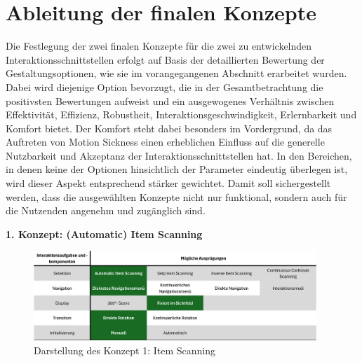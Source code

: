 \section{Ableitung der finalen Konzepte}

Die Festlegung der zwei finalen Konzepte für die zwei zu entwickelnden Interaktionsschnittstellen erfolgt auf Basis der detaillierten Bewertung der Gestaltungsoptionen, wie sie im vorangegangenen Abschnitt erarbeitet wurden. Dabei wird diejenige Option bevorzugt, die in der Gesamtbetrachtung die positivsten Bewertungen aufweist und ein ausgewogenes Verhältnis zwischen Effektivität, Effizienz, Robustheit, Interaktionsgeschwindigkeit, Erlernbarkeit und Komfort bietet.
Der Komfort steht dabei besonders im Vordergrund, da das Auftreten von Motion Sickness einen erheblichen Einfluss auf die generelle Nutzbarkeit und Akzeptanz der Interaktionsschnittstellen hat. In den Bereichen, in denen keine der Optionen hinsichtlich der Parameter eindeutig überlegen ist, wird dieser Aspekt entsprechend stärker gewichtet. Damit soll sichergestellt werden, dass die ausgewählten Konzepte nicht nur funktional, sondern auch für die Nutzenden angenehm und zugänglich sind.


{\normalfont \bfseries 1. Konzept: (Automatic) Item Scanning} 

\begin{figure}[tbh]
    \centering
    \includegraphics[width=0.95\textwidth]{images/MorphKasten-Item.png}
    \caption{Darstellung des Konzept 1: Item Scanning}
    \label{fig:MorphKasten-Item}
\end{figure}

